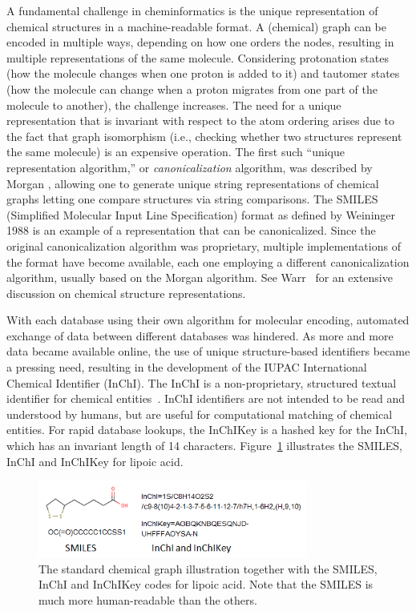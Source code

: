 \documentclass{sig-alternate}
\begin{document}
A fundamental challenge in cheminformatics is the unique
representation of chemical structures in a machine-readable format. A
(chemical) graph can be encoded in multiple ways, depending on how one
orders the nodes, resulting in multiple representations of the same
molecule. Considering protonation states
(how the molecule changes when one proton is added
to it) and tautomer states (how the molecule can change when a proton
migrates from one part of the molecule to another), the challenge
increases. The need for a unique representation that is invariant with
respect to the atom ordering arises due to the fact that graph
isomorphism (i.e., checking whether two structures represent the same molecule) is an
expensive operation. The first such ``unique representation
algorithm,'' or \emph{canonicalization} algorithm, was described by
Morgan \cite{Morgan1965}, allowing one to generate unique string
representations of chemical graphs letting one compare structures via
string comparisons. The SMILES (Simplified Molecular Input Line
Specification) format as defined by Weininger 1988\cite{Weininger:1988kx} is an example of a
representation that can be canonicalized. Since the original
canonicalization algorithm was proprietary, multiple implementations
of the format have become available, each one employing a different
canonicalization algorithm, usually based on the Morgan algorithm. See
Warr~\cite{Warr:2011vn} for an extensive discussion on chemical
structure representations.

With each database using their own algorithm for molecular encoding,
automated exchange of data between different databases was hindered.
As more and more data became available online, the use of unique
structure-based identifiers became a pressing need, resulting in the
development of the IUPAC International Chemical Identifier (InChI). The
InChI is a non-proprietary, structured textual identifier for chemical
entities~\cite{inchi}. InChI identifiers are not intended to be read
and understood by humans, but are useful for computational matching of
chemical entities. For rapid database lookups, the InChIKey is a
hashed key for the InChI, which has an invariant length of 14
characters. Figure~\ref{figure:smiles} illustrates
the SMILES, InChI and InChIKey for lipoic acid.

\begin{figure}
\centering
\includegraphics[height=1in]{lipoicacid.png}
\caption{The standard chemical graph illustration together with the
  SMILES, InChI and InChIKey codes for lipoic acid. Note that the
  SMILES is much more human-readable than the others.}
\label{figure:smiles}
\end{figure}
\end{document}
